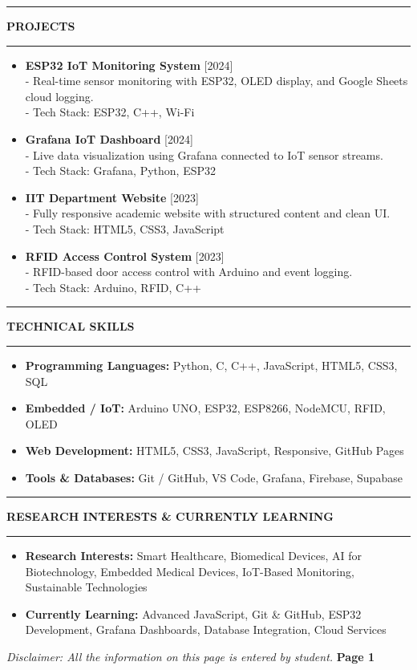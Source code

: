 \documentclass[a4paper,10pt]{article}
\newcommand{\cvsection}[1]{
    \vspace{1ex}
    \hrule
    \vspace{0.5ex}
    \begin{center}
        \textbf{\MakeUppercase{#1}}
    \end{center}
    \vspace{-1.5ex}
    \hrule
    \vspace{1ex}
}
\begin{document}
\cvsection{Projects}
\begin{itemize}[leftmargin=1.5em, noitemsep, itemsep=0.8ex, topsep=0pt]
    \item \textbf{ESP32 IoT Monitoring System} \hfill [2024] \\
    - Real-time sensor monitoring with ESP32, OLED display, and Google Sheets cloud logging.\\
    - Tech Stack: ESP32, C++, Wi-Fi
    
    \item \textbf{Grafana IoT Dashboard} \hfill [2024] \\
    - Live data visualization using Grafana connected to IoT sensor streams.\\
    - Tech Stack: Grafana, Python, ESP32
    
    \item \textbf{IIT Department Website} \hfill [2023] \\
    - Fully responsive academic website with structured content and clean UI.\\
    - Tech Stack: HTML5, CSS3, JavaScript
    
    \item \textbf{RFID Access Control System} \hfill [2023] \\
    - RFID-based door access control with Arduino and event logging.\\
    - Tech Stack: Arduino, RFID, C++
\end{itemize}

\cvsection{Technical Skills}
\begin{itemize}[leftmargin=1.5em, noitemsep, topsep=0pt]
    \item \textbf{Programming Languages:} Python, C, C++, JavaScript, HTML5, CSS3, SQL
    \item \textbf{Embedded / IoT:} Arduino UNO, ESP32, ESP8266, NodeMCU, RFID, OLED
    \item \textbf{Web Development:} HTML5, CSS3, JavaScript, Responsive, GitHub Pages
    \item \textbf{Tools \& Databases:} Git / GitHub, VS Code, Grafana, Firebase, Supabase
\end{itemize}

\cvsection{Research Interests \& Currently Learning}
\begin{itemize}[leftmargin=1.5em, noitemsep, topsep=0pt]
    \item \textbf{Research Interests:} Smart Healthcare, Biomedical Devices, AI for Biotechnology, Embedded Medical Devices, IoT-Based Monitoring, Sustainable Technologies
    \item \textbf{Currently Learning:} Advanced JavaScript, Git \& GitHub, ESP32 Development, Grafana Dashboards, Database Integration, Cloud Services
\end{itemize}

\vfill
\noindent\textit{Disclaimer: All the information on this page is entered by student.} \hfill \textbf{Page 1}
\end{document}
